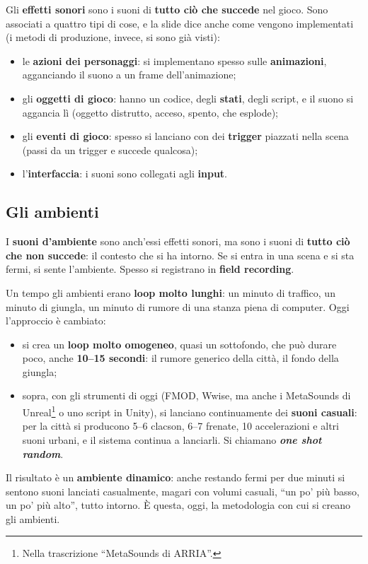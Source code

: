 Gli \textbf{effetti sonori} sono i suoni di \textbf{tutto ciò che succede} nel
gioco. Sono associati a quattro tipi di cose, e la slide dice anche come vengono
implementati (i metodi di produzione, invece, si sono già visti):
\begin{itemize}
  \item le \textbf{azioni dei personaggi}: si implementano spesso sulle
        \textbf{animazioni}, agganciando il suono a un frame dell'animazione;
  \item gli \textbf{oggetti di gioco}: hanno un codice, degli \textbf{stati},
        degli script, e il suono si aggancia lì (oggetto distrutto, acceso,
        spento, che esplode);
  \item gli \textbf{eventi di gioco}: spesso si lanciano con dei
        \textbf{trigger} piazzati nella scena (passi da un trigger e succede
        qualcosa);
  \item l'\textbf{interfaccia}: i suoni sono collegati agli \textbf{input}.
\end{itemize}

\subsection{Gli ambienti}
\label{z9:subsec:ambienti}

I \textbf{suoni d'ambiente} sono anch'essi effetti sonori, ma sono i suoni di
\textbf{tutto ciò che non succede}: il contesto che si ha intorno. Se si entra
in una scena e si sta fermi, si sente l'ambiente. Spesso si registrano in
\textbf{field recording}.

Un tempo gli ambienti erano \textbf{loop molto lunghi}: un minuto di traffico, un
minuto di giungla, un minuto di rumore di una stanza piena di computer. Oggi
l'approccio è cambiato:
\begin{itemize}
  \item si crea un \textbf{loop molto omogeneo}, quasi un sottofondo, che può
        durare poco, anche \textbf{10--15 secondi}: il rumore generico della
        città, il fondo della giungla;
  \item sopra, con gli strumenti di oggi (FMOD, Wwise, ma anche i MetaSounds di
        Unreal\footnote{Nella trascrizione ``MetaSounds di ARRIA''.} o uno
        script in Unity), si lanciano continuamente dei \textbf{suoni
        casuali}: per la città si producono 5--6 clacson, 6--7 frenate, 10
        accelerazioni e altri suoni urbani, e il sistema continua a lanciarli.
        Si chiamano \textbf{\emph{one shot random}}.
\end{itemize}
Il risultato è un \textbf{ambiente dinamico}: anche restando fermi per due minuti
si sentono suoni lanciati casualmente, magari con volumi casuali, ``un po' più
basso, un po' più alto'', tutto intorno. È questa, oggi, la metodologia con cui
si creano gli ambienti.

